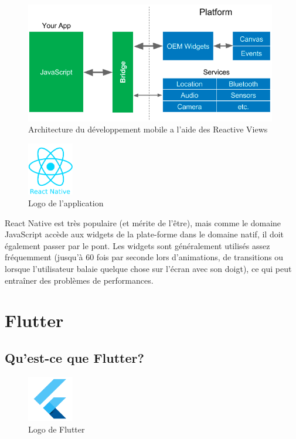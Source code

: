 \begin{figure}[h]
	\begin{center}
		\includegraphics[width=11cm]{Images/chapter2/reactive_views.png}
		\caption{{\footnotesize Architecture du développement mobile a l'aide des Reactive Views\cite{leler_whats_2017}}}
	\end{center}
\end{figure}

\begin{figure}
	\includegraphics[width=2cm]{Images/chapter2/react_native_logo.png}
	\vspace{-20pt}
	\caption{{\footnotesize Logo de l'application}}
\end{figure}

React Native est très populaire (et mérite de l'être), mais comme le domaine JavaScript accède aux widgets de la plate-forme dans le domaine natif, il doit également passer par le pont. Les widgets sont généralement utilisés assez fréquemment (jusqu'à 60 fois par seconde lors d'animations, de transitions ou lorsque l'utilisateur balaie quelque chose sur l'écran avec son doigt), ce qui peut entraîner des problèmes de performances.

\section{Flutter}

\subsection{Qu'est-ce que Flutter?}

\begin{figure}
	\vspace{-15pt}
	\includegraphics[width=2cm]{Images/chapter2/flutter_logo.png}
	\vspace{-20pt}
	\caption{{\footnotesize Logo de Flutter}}
\end{figure}

